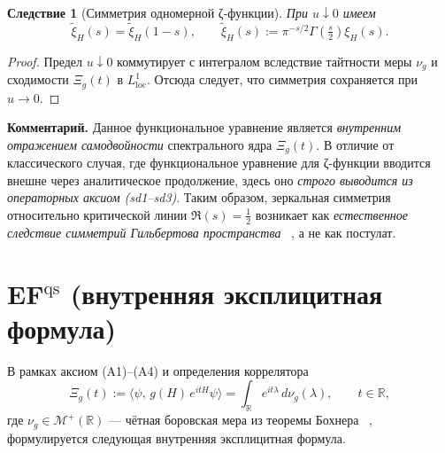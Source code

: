 \documentclass{article}
\numberwithin{equation}{section}
\theoremstyle{plain}
\newtheorem{corollary}{Следствие}
\theoremstyle{definition}
\theoremstyle{remark}
\begin{document}
\begin{corollary}[Симметрия одномерной ζ-функции]
\label{cor:xi-symmetry}
При \(u\downarrow0\) имеем
\begin{equation}
\boxed{
\widetilde{\xi}_H(s)=\widetilde{\xi}_H(1-s),
\qquad
\widetilde{\xi}_H(s)
:=\pi^{-s/2}\Gamma\!\left(\tfrac{s}{2}\right)\xi_H(s).
}
\end{equation}
\end{corollary}

\begin{proof}
Предел \(u\downarrow0\) коммутирует с интегралом вследствие тайтности меры $\nu_g$ и сходимости $\Xi_g(t)$ в $L^1_{\mathrm{loc}}$.
Отсюда следует, что симметрия сохраняется при $u\to0$.
\end{proof}

\noindent
\textbf{Комментарий.}
Данное функциональное уравнение является \emph{внутренним отражением самодвойности}
спектрального ядра $\Xi_g(t)$.  
В отличие от классического случая, где функциональное уравнение для ζ-функции
вводится внешне через аналитическое продолжение,  
здесь оно \emph{строго выводится из операторных аксиом (sd1–sd3)}.  
Таким образом, зеркальная симметрия относительно критической линии
\(\Re(s)=\tfrac12\)
возникает как \emph{естественное следствие симметрий Гильбертова пространства} ~\cite{Voros1987},
а не как постулат.

\clearpage

\section{EF$^{\mathrm{qs}}$ (внутренняя эксплицитная формула)}

\noindent
В рамках аксиом (A1)–(A4) и определения коррелятора
\begin{equation}
\label{eq:Xi-def}
\Xi_g(t):=\big\langle \psi,\,g(H)\,e^{itH}\psi\big\rangle
=\int_{\mathbb R} e^{it\lambda}\,d\nu_g(\lambda),\qquad t\in\mathbb R,
\end{equation}
где $\nu_g\in\mathcal M^+(\mathbb R)$ — чётная боровская мера из теоремы Бохнера ~\cite{Rudin1991}, 
формулируется следующая внутренняя эксплицитная формула.
\end{document}
